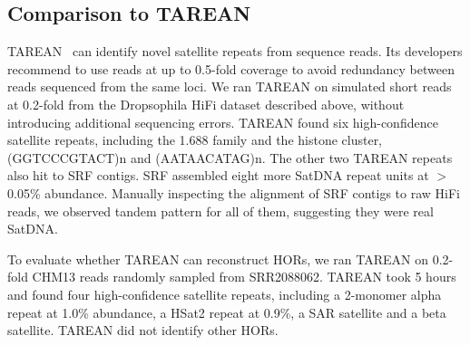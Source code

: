 \documentclass{bioinfo}
\begin{document}
\subsection{Comparison to TAREAN}

TAREAN~\citep{Novak:2017wx} can identify novel satellite repeats from sequence
reads. Its developers recommend to use reads at up to 0.5-fold coverage to
avoid redundancy between reads sequenced from the same loci. We
ran TAREAN on simulated short reads at 0.2-fold from the Dropsophila HiFi
dataset described above, without introducing additional sequencing errors.
TAREAN found six high-confidence satellite repeats, including the 1.688 family
and the histone cluster, (GGTCCCGTACT)n and (AATAACATAG)n. The other two TAREAN
repeats also hit to SRF contigs. SRF assembled eight more SatDNA repeat units
at $>$0.05\% abundance. Manually inspecting the alignment of SRF contigs to raw HiFi reads,
we observed tandem pattern for all of them, suggesting they were real SatDNA.

To evaluate whether TAREAN can reconstruct HORs, we ran TAREAN on 0.2-fold
CHM13 reads randomly sampled from SRR2088062. TAREAN took 5 hours and found
four high-confidence satellite repeats, including a 2-monomer alpha repeat at
1.0\% abundance, a HSat2 repeat at 0.9\%, a SAR satellite and a beta satellite.
TAREAN did not identify other HORs.

%
%
\end{document}
